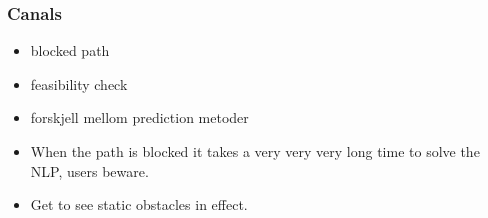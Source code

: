 
\subsubsection{Canals}
\begin{itemize}
    \item blocked path
    \item feasibility check
    \item forskjell mellom prediction metoder
    \item When the path is blocked it takes a very very very long time to solve the NLP, users beware.
    \item Get to see static obstacles in effect.
\end{itemize}



